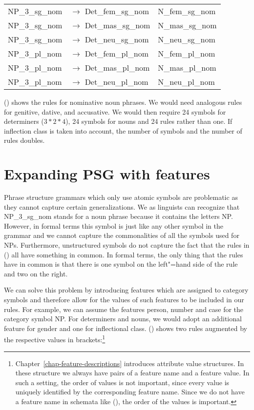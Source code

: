 \begin{tabular}[t]{@{}l@{ }l@{~~}l}
NP\_3\_sg\_nom  & $\to$ Det\_fem\_sg\_nom & N\_fem\_sg\_nom \\
NP\_3\_sg\_nom  & $\to$ Det\_mas\_sg\_nom & N\_mas\_sg\_nom \\
NP\_3\_sg\_nom  & $\to$ Det\_neu\_sg\_nom & N\_neu\_sg\_nom \\
NP\_3\_pl\_nom  & $\to$ Det\_fem\_pl\_nom & N\_fem\_pl\_nom \\
NP\_3\_pl\_nom  & $\to$ Det\_mas\_pl\_nom & N\_mas\_pl\_nom \\
NP\_3\_pl\_nom  & $\to$ Det\_neu\_pl\_nom & N\_neu\_pl\_nom \\[2mm]
\end{tabular}
\z
() shows the rules for nominative noun phrases. We would need analogous rules for genitive,
dative, and accusative. We would then require 24 symbols for determiners ($3*2*4$), 24 symbols for nouns and
24 rules rather than one. If inflection class is taken into account, the number of symbols and the
number of rules doubles. 

\section{Expanding PSG with features}
\label{sec-PSG-Merkmale}

Phrase structure grammars which only use atomic symbols are problematic as they cannot capture certain generalizations.
We as linguists can recognize that NP\_3\_sg\_nom stands for a noun phrase because it contains the letters NP. 
However, in formal terms this symbol is just like any other symbol in the grammar and we cannot capture the commonalities
of all the symbols used for NPs. Furthermore, unstructured symbols do not capture the fact that the rules in () 
all have something in common. In formal terms, the only thing that the rules have in common is that there is one symbol on the
left"=hand side of the rule and two on the right.

We can solve this problem by introducing features which are assigned to category symbols and therefore allow for the values of
such features to be included in our rules. For example, we can assume the features person, number and case for the category
symbol NP. For determiners and nouns, we would adopt an additional feature for gender and one for
inflectional class. () shows two rules augmented by the respective values in brackets:\footnote{
  Chapter~\ref{chap-feature-descriptions} introduces attribute value structures. In these structure we always
have pairs of a feature name and a feature value. In such a setting, the order of values is not
important, since every value is uniquely identified by the corresponding feature name. Since we do not have a feature name
in schemata like (), the order of the values is important.
}


